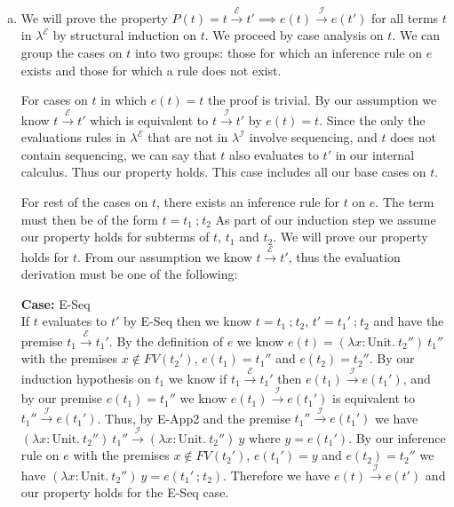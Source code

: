 \documentclass[12pt, fleqn]{article}
\begin{document}
\begin{enumerate}[(a)]
    \item We will prove the property $P(t) = t \xrightarrow{\mathcal{E}} t' \implies e(t) \xrightarrow{\mathcal{I}} e(t')$ for all terms
    $t$ in $\lambda^\mathcal{E}$ by structural induction on $t$. We proceed by case analysis on $t$.
    We can group the cases on $t$ into two groups: those for which an inference rule on $e$ exists and those for which a rule does not
    exist. 

    For cases on $t$ in which $e(t) = t$ the proof is trivial.
    By our assumption we know $t \xrightarrow{\mathcal{E}} t'$ which is equivalent to $t \xrightarrow{\mathcal{I}} t'$ by $e(t) = t$.
    Since the only the evaluations rules in $\lambda^{\mathcal{E}}$ that are not in $\lambda^{\mathcal{I}}$ involve sequencing, 
    and $t$ does not contain sequencing, we can say that $t$ also evaluates to $t'$ in our internal calculus. Thus our property holds. 
    This case includes all our base cases on $t$.

    For rest of the cases on $t$, there exists an inference rule for $t$ on $e$. The term must then be of the form $t = t_1\:\textrm{;}\:t_2$
    As part of our induction step we assume our property holds for subterms of $t$, $t_1$ and $t_2$. We will prove our property holds for $t$. 
    From our assumption we know $t \xrightarrow{\mathcal{E}} t'$, thus the evaluation derivation must be one of the following:
    
    \textbf{Case:} E-Seq\\
    If $t$ evaluates to $t'$ by E-Seq then we know $t = t_1\:\textrm{;}\:t_2$, $t' = t_1'\:\textrm{;}\:t_2$ and have the premise
    $t_1 \xrightarrow{\mathcal{E}} t_1'$. By the definition of $e$ we know $e(t) = (\lambda x : \textrm{Unit}.\:t_2'')\:t_1''$ with
    the premises $x \notin FV(t_2')$, $e(t_1) = t_1''$ and $e(t_2) = t_2''$.
    By our induction hypothesis on $t_1$ we know if $t_1 \xrightarrow{\mathcal{E}} t_1'$ then $e(t_1) \xrightarrow{\mathcal{I}} e(t_1')$,
    and by our premise $e(t_1) = t_1''$ we know $e(t_1) \xrightarrow{\mathcal{I}} e(t_1')$ is equivalent to $t_1'' \xrightarrow{\mathcal{I}} e(t_1')$.
    Thus, by E-App2 and the premise $t_1'' \xrightarrow{\mathcal{I}} e(t_1')$ we have
    $(\lambda x : \textrm{Unit}.\:t_2'')\:t_1'' \xrightarrow{\mathcal{I}} (\lambda x : \textrm{Unit}.\:t_2'')\:y$ where $y = e(t_1')$. By our
    inference rule on $e$ with the premises $x \notin FV(t_2')$, $e(t_1') = y$ and $e(t_2) = t_2''$ we have
    $(\lambda x : \textrm{Unit}.\:t_2'')\:y = e(t_1'\:\textrm{;}\:t_2)$. Therefore we have $e(t) \xrightarrow{\mathcal{I}} e(t')$ and our property holds for
    the E-Seq case.


\end{enumerate}
\end{document}
